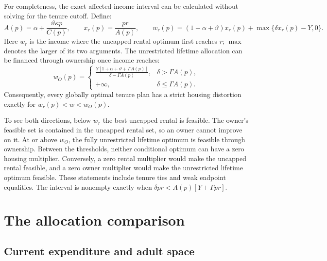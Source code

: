 \documentclass[11pt]{article}
\begin{document}
For completeness, the exact affected-income interval can be calculated
without solving for the tenure cutoff. Define:
\begin{equation}
A(p)=\alpha+\frac{\vartheta\kappa p}{C(p)},\qquad
x_r(p)=\frac{pr}{A(p)},\qquad
w_r(p)=(1+\alpha+\vartheta)x_r(p)+\max\{\delta x_r(p)-Y,0\}.
\end{equation}
Here $w_r$ is the income where the uncapped rental optimum first reaches
$r$; $\max$ denotes the larger of its two arguments. The unrestricted
lifetime allocation can be financed through ownership once income reaches:
\begin{equation}
w_O(p)=\begin{cases}
\displaystyle\frac{Y[1+\alpha+\vartheta+\Gamma A(p)]}{\delta-\Gamma A(p)},
 &\delta>\Gamma A(p),\\[5pt]
+\infty,&\delta\le\Gamma A(p).
\end{cases}
\end{equation}
Consequently, every globally optimal tenure plan has a strict housing
distortion exactly for $w_r(p)<w<w_O(p)$.

To see both directions, below $w_r$ the best uncapped rental is feasible.
The owner's feasible set is contained in the uncapped rental set, so an
owner cannot improve on it. At or above $w_O$, the fully unrestricted
lifetime optimum is feasible through ownership. Between the thresholds,
neither conditional optimum can have a zero housing multiplier. Conversely,
a zero rental multiplier would make the uncapped rental feasible, and a
zero owner multiplier would make the unrestricted lifetime optimum feasible.
These statements include tenure ties and weak endpoint equalities. The
interval is nonempty exactly when $\delta pr<A(p)[Y+\Gamma pr]$.

\section{The allocation comparison}\label{app:allocation}

\subsection{Current expenditure and adult space}
\end{document}
